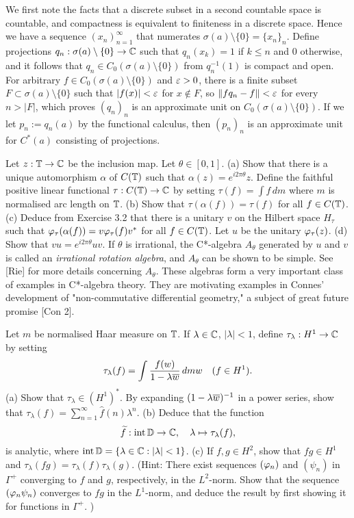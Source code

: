 \documentclass{../solution}
\begin{document}
\begin{sol}
We first note the facts that a discrete subset in a second countable space is countable, and compactness is equivalent to finiteness in a discrete space.
Hence we have a sequence $(x_n)_{n=1}^\infty$ that numerates $\sigma(a)\setminus\{0\}=\{x_n\}_n$.
Define projections $q_n:\sigma(a)\setminus\{0\}\to\mathbb{C}$ such that $q_n(x_k)=1$ if $k\le n$ and 0 otherwise, and it follows that $q_n\in C_0(\sigma(a)\setminus\{0\})$ from $q_n^{-1}(1)$ is compact and open.
For arbitrary $f\in C_0(\sigma(a)\setminus\{0\})$ and $\varepsilon>0$, there is a finite subset $F\subset\sigma(a)\setminus\{0\}$ such that $|f(x)|<\varepsilon$ for $x\notin F$, so $\|fq_n-f\|<\varepsilon$ for every $n>|F|$, which proves $(q_n)_n$ is an approximate unit on $C_0(\sigma(a)\setminus\{0\})$.
If we let $p_n:=q_n(a)$ by the functional calculus, then $(p_n)_n$ is an approximate unit for $C^*(a)$ consisting of projections.
\end{sol}


\begin{prb}
Let $z:\mathbb{T}\to\mathbb{C}$ be the inclusion map.
Let $\theta\in[0,1]$.
(a) Show that there is a unique automorphism $\alpha$ of $C(\mathbb{T})$ such that $\alpha(z)=e^{i2\pi\theta}z$.
Define the faithful positive linear functional $\tau:C(\mathbb{T})\to\mathbb{C}$ by setting $\tau(f)=\int f\,dm$ where $m$ is normalised arc length on $\mathbb{T}$.
(b) Show that $\tau(\alpha(f))=\tau(f)$ for all $f\in C(\mathbb{T})$.
(c) Deduce from Exercise 3.2 that there is a unitary $v$ on the Hilbert space $H_\tau$ such that $\varphi_\tau(\alpha(f))=v\varphi_\tau(f)v^*$ for all $f\in C(\mathbb{T})$.
Let $u$ be the unitary $\varphi_\tau(z)$.
(d) Show that $vu=e^{i2\pi\theta}uv$.
If $\theta$ is irrational, the C*-algebra $A_\theta$ generated by $u$ and $v$ is called an \emph{irrational rotation algebra}, and $A_\theta$ can be shown to be simple.
See [Rie] for more details concerning $A_\theta$.
These algebras form a very important class of examples in C*-algebra theory.
They are motivating examples in Connes' development of "non-commutative differential geometry," a subject of great future promise [Con 2].
\end{prb}
\begin{sol}
\end{sol}


\begin{prb}
Let $m$ be normalised Haar measure on $\mathbb{T}$.
If $\lambda\in\mathbb{C}$, $|\lambda|<1$, define $\tau_\lambda:H^1\to\mathbb{C}$ by setting
\[\tau_\lambda(f)=\int\frac{f(w)}{1-\lambda\overline w}\,dmw\quad(f\in H^1).\]
(a) Show that $\tau_\lambda\in(H^1)^*$.
By expanding $(1-\lambda\overline w)^{-1}$ in a power series, show that $\tau_\lambda(f)=\sum_{n=1}^\infty\hat f(n)\lambda^n$.
(b) Deduce that the function
\[\widetilde f:\operatorname{int}\mathbb{D}\to\mathbb{C},\quad\lambda\mapsto\tau_\lambda(f),\]
is analytic, where $\operatorname{int}\mathbb{D}=\{\lambda\in\mathbb{C}:|\lambda|<1\}$.
(c) If $f,g\in H^2$, show that $fg\in H^1$ and $\tau_\lambda(fg)=\tau_\lambda(f)\tau_\lambda(g)$.
(Hint: There exist sequences $(\varphi_n)$ and $(\psi_n)$ in $\Gamma^+$ converging to $f$ and $g$, respectively, in the $L^2$-norm.
Show that the sequence $(\varphi_n\psi_n)$ converges to $fg$ in the $L^1$-norm, and deduce the result by first showing it for functions in $\Gamma^+$. )
\end{prb}
\begin{sol}
\end{sol}
\end{document}
